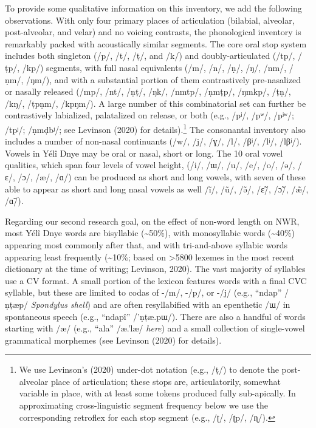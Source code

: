 \documentclass[english,,man,floatsintext]{apa6}
\begin{document}
To provide some qualitative information on this inventory, we add the following observations. With only four primary places of articulation (bilabial, alveolar, post-alveolar, and velar) and no voicing contrasts, the phonological inventory is remarkably packed with acoustically similar segments. The core oral stop system includes both singleton (/p/, /t/, /ṭ/, and /k/) and doubly-articulated (/tp/, /ṭp/, /kp/) segments, with full nasal equivalents (/m/, /n/, /ṇ/, /ŋ/, /nm/, /ṇm/, /ŋm/), and with a substantial portion of them contrastively pre-nasalized or nasally released (/mp/, /nt/, /ṇṭ/, /ŋk/, /nmtp/, /ṇmṭp/, /ŋmkp/, /ṭṇ/, /kŋ/, /ṭpṇm/, /kpŋm/). A large number of this combinatorial set can further be contrastively labialized, palatalized on release, or both (e.g., /pʲ/, /pʷ/, /pʲʷ/; /tpʲ/; /ṇmḍbʲ/; see Levinson (2020) for details).\footnote{We use Levinson's (2020) under-dot notation (e.g., /ṭ/) to denote the post-alveolar place of articulation; these stops are, articulatorily, somewhat variable in place, with at least some tokens produced fully sub-apically. In approximating cross-linguistic segment frequency below we use the corresponding retroflex for each stop segment (e.g., /ʈ/, /ʈp/, /ɳ/).} The consonantal inventory also includes a number of non-nasal continuants (/w/, /j/, /ɣ/, /l/, /βʲ/, /lʲ/, /lβʲ/). Vowels in Yélî Dnye may be oral or nasal, short or long. The 10 oral vowel qualities, which span four levels of vowel height, (/i/, /ɯ/, /u/, /e/, /o/, /ə/, /ɛ/, /ɔ/, /æ/, /ɑ/) can be produced as short and long vowels, with seven of these able to appear as short and long nasal vowels as well /ĩ/, /ũ/, /ə̃/, /ɛ̃/, /ɔ̃/, /æ̃/, /ɑ̃/).

Regarding our second research goal, on the effect of non-word length on NWR, most Yélî Dnye words are bisyllabic (\textasciitilde{}50\%), with monosyllabic words (\textasciitilde{}40\%) appearing most commonly after that, and with tri-and-above syllabic words appearing least frequently (\textasciitilde{}10\%; based on \textgreater{}5800 lexemes in the most recent dictionary at the time of writing; Levinson, 2020). The vast majority of syllables use a CV format. A small portion of the lexicon features words with a final CVC syllable, but these are limited to codas of -/m/, -/p/, or -/j/ (e.g., \enquote{ndap} /ṇṭæp/ \emph{Spondylus shell}) and are often resyllabified with an epenthetic /ɯ/ in spontaneous speech (e.g., \enquote{ndapî} /'ṇṭæ.pɯ/). There are also a handful of words starting with /æ/ (e.g., \enquote{ala} /æ.'læ/ \emph{here}) and a small collection of single-vowel grammatical morphemes (see Levinson (2020) for details).
\end{document}
